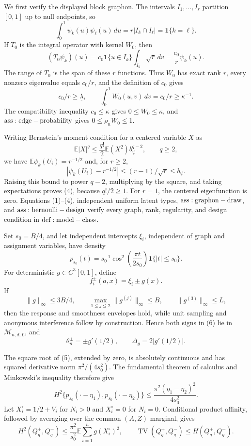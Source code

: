 We first verify the displayed block graphon.  The intervals \(I_1,\ldots,I_r\) partition \([0,1]\) up to null endpoints, so
\[
 \int_0^1\psi_k(u)\psi_\ell(u)\,du
 =r|I_k\cap I_\ell|=\mathbf1\{k=\ell\}.
\tag{1}
\]
If \(T_0\) is the integral operator with kernel \(W_0\), then
\[
 (T_0\psi_k)(u)
 =c_0\mathbf1\{u\in I_k\}\int_{I_k}\sqrt r\,dv
 =\frac{c_0}{r}\psi_k(u).
\tag{2}
\]
The range of \(T_0\) is the span of these \(r\) functions.  Thus \(W_0\) has exact rank \(r\), every nonzero eigenvalue equals \(c_0/r\), and the definition of \(c_0\) gives
\[
 c_0/r\geq\underline\lambda,
 \qquad \int_0^1W_0(u,v)\,dv=c_0/r\geq\kappa^{-1}.
\tag{3}
\]
The compatibility inequality \(c_0\leq\kappa\) gives \(0\leq W_0\leq\kappa\), and \({\rm ass:edge-probability}\) gives \(0\leq\rho_nW_0\leq1\).

Writing Bernstein's moment condition for a centered variable \(X\) as
\[
 \mathbb E|X|^q\leq\frac{q!}{2}\mathbb E(X^2)b_\psi^{q-2},
 \qquad q\geq2,
\tag{4}
\]
we have \(\mathbb E\psi_k(U_i)=r^{-1/2}\) and, for \(r\geq2\),
\[
 |\psi_k(U_i)-r^{-1/2}|\leq(r-1)/\sqrt r\leq b_\psi.
\]
Raising this bound to power \(q-2\), multiplying by the square, and taking expectations proves (4), because \(q!/2\geq1\).  For \(r=1\), the centered eigenfunction is zero.  Equations (1)--(4), independent uniform latent types, \({\rm ass:graphon-draw}\), and \({\rm ass:bernoulli-design}\) verify every graph, rank, regularity, and design condition in \({\rm def:model-class}\).

Set \(s_0=B/4\), and let independent intercepts \(\xi_i\), independent of graph and assignment variables, have density
\[
 p_{s_0}(t)=s_0^{-1}\cos^2\!\left(\frac{\pi t}{2s_0}\right)
 \mathbf1\{|t|\leq s_0\}.
\tag{5}
\]
For deterministic \(g\in C^3[0,1]\), define
\[
 f_i^\pm(a,x)=\xi_i\pm g(x).
\tag{6}
\]
If
\[
 \|g\|_\infty\leq3B/4,
 \qquad \max_{1\leq j\leq2}\|g^{(j)}\|_\infty\leq B,
 \qquad \|g^{(3)}\|_\infty\leq L,
\tag{7}
\]
then the response and smoothness envelopes hold, while unit sampling and anonymous interference follow by construction.  Hence both signs in (6) lie in \(\mathcal M_{n,d,L}\), and
\[
 \theta_n^\pm=\pm g'(1/2),
 \qquad \Delta_g=2|g'(1/2)|.
\tag{8}
\]

The square root of (5), extended by zero, is absolutely continuous and has squared derivative norm \(\pi^2/(4s_0^2)\).  The fundamental theorem of calculus and Minkowski's inequality therefore give
\[
 H^2\{p_{s_0}(\mathord\cdot-\eta_1),p_{s_0}(\mathord\cdot-\eta_2)\}
 \leq\frac{\pi^2(\eta_1-\eta_2)^2}{4s_0^2}.
\tag{9}
\]
Let \(X_i^\circ=1/2+V_i\) for \(N_i>0\) and \(X_i^\circ=0\) for \(N_i=0\).  Conditional product affinity, followed by averaging over the common \((A,Z)\) marginal, gives
\[
 H^2(Q_g^+,Q_g^-)
 \leq\frac{\pi^2}{s_0^2}\mathbb E\sum_{i=1}^ng(X_i^\circ)^2,
 \qquad \operatorname{TV}(Q_g^+,Q_g^-)\leq H(Q_g^+,Q_g^-).
\tag{10}
\]

